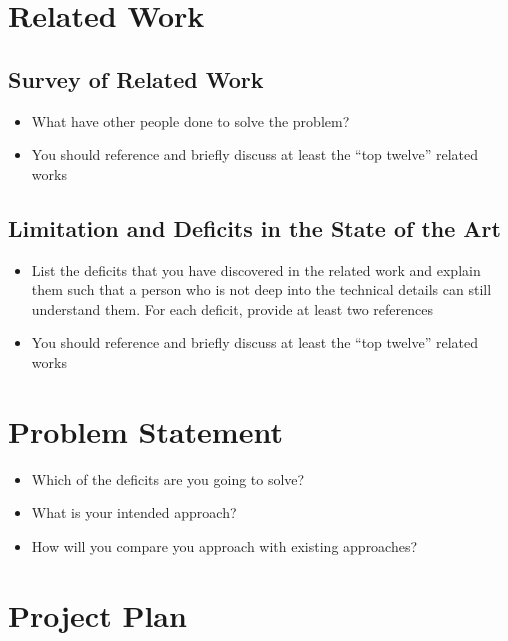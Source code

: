 \documentclass[thesis]{mas_proposal}
\begin{document}
\section{Related Work}

\subsection{Survey of Related Work}
\begin{itemize}
    \item What have other people done to solve the problem?
    \item You should reference and briefly discuss at least the ``top twelve'' related works
\end{itemize}

\subsection{Limitation and Deficits in the State of the Art}
\begin{itemize}
    \item List the deficits that you have discovered in the related work and explain them such that a person who is not deep into the technical details can still understand them.
    For each deficit, provide at least two references
    \item You should reference and briefly discuss at least the ``top twelve'' related works
\end{itemize}

\section{Problem Statement}
\begin{itemize}
    \item Which of the deficits are you going to solve?
    \item What is your intended approach?
    \item How will you compare you approach with existing approaches?
\end{itemize}

\section{Project Plan}
\end{document}
